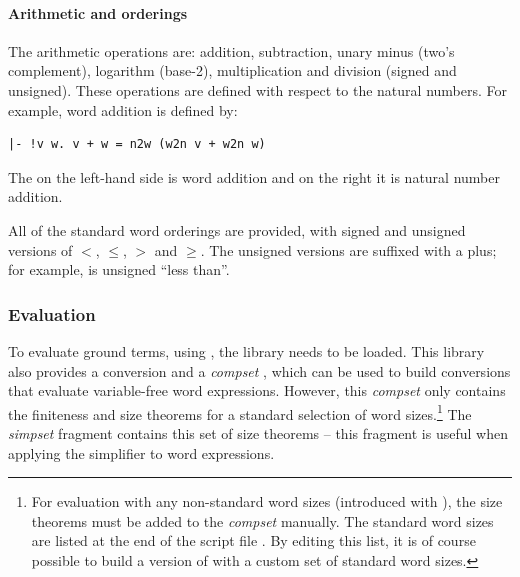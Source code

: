 {\paragraph{Arithmetic and orderings}

The arithmetic operations are: addition, subtraction, unary minus (two's 
complement), logarithm (base-2), multiplication and division (signed and 
unsigned).
These operations are defined with respect to the natural numbers.  For example, 
word addition is defined by:
\begin{hol}
\begin{verbatim}
|- !v w. v + w = n2w (w2n v + w2n w)
\end{verbatim}
\end{hol}
The \holtxt{+} on the left-hand side is word addition and on the right it is 
natural number addition.

All of the standard word orderings are provided, with signed and unsigned 
versions of $<$, $\leq$, $>$ and $\geq$.  The unsigned versions are suffixed 
with a plus; for example, \holtxt{<+} is unsigned ``less than''.

\subsubsection{Evaluation}

To evaluate ground terms, using , the library  
needs to be loaded.  This library also provides a conversion  
and a \emph{compset} , which can be used to build
conversions that evaluate variable-free word expressions.  However, this
\emph{compset} only contains the finiteness and size theorems for a standard
selection of word sizes.\footnote{For evaluation with any non-standard word
sizes (introduced with ), the size theorems must be added to
the \emph{compset} manually.  The standard word sizes are listed at the end of
the script file .  By editing this list,
it is of course possible to build a version of \HOL{} with a custom set of
standard word sizes.} The \emph{simpset} fragment  contains this
set of size theorems -- this fragment is useful when applying the simplifier to
word expressions.

}
